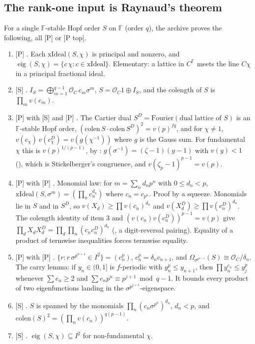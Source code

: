 \documentclass[11pt]{article}
\newcommand{\mP}{\textsf{[P]}}
\newcommand{\mPt}{\textsf{[P top]}}
\newcommand{\mS}{\textsf{[S]}}
\newcommand{\cO}{\mathcal O}
\newcommand{\Fq}{\mathbb F}
\theoremstyle{remark}
\begin{document}
\subsection{The rank-one input is Raynaud's theorem}\label{sec:raynaud}
For a single $\Fq$-stable Hopf order $S$ on $\Fq$ (order $q$), the archive proves the following, all \mP{} or \mPt.
\begin{enumerate}[nosep]
\item \mP{} . Each $\mathrm{xIdeal}(S,\chi)$ is principal and nonzero, and $\operatorname{eig}(S,\chi)=\{c\,\chi: c\in\mathrm{xIdeal}\}$. Elementary: a lattice in $C^{\Fq}$ meets the line $C\chi$ in a principal fractional ideal.
\item \mS{} . $I_S=\bigoplus_{m=1}^{q-1}\cO_C\,c_m\sigma^m$, $S=\cO_C1\oplus I_S$, and the colength of $S$ is $\prod_m v(c_m)$.
\item \mP{}  with \mS{}  and \mP{} . The Cartier dual $S^D=\mathrm{Fourier}(\text{dual lattice of }S)$ is an $\Fq$-stable Hopf order, $(\mathrm{colen}\,S\cdot\mathrm{colen}\,S^D)^2=v(p)^{fq}$, and for $\chi\ne1$, $v(c_\chi)\,v(c^D_\chi)=v(g(\chi^{-1}))$ where $g$ is the Gauss sum. For fundamental $\chi$ this is $v(p)^{1/(p-1)}$, by : $g(\sigma^{-1})=(\zeta-1)(y-1)$ with $v(y)<1$ (), which is Stickelberger's congruence, and $v(\zeta_p-1)^{p-1}=v(p)$.
\item \mP{}  with \mP{} . Monomial law: for $m=\sum_n d_np^n$ with $0\le d_n<p$, $\mathrm{xIdeal}(S,\sigma^m)=(\prod_nc_n^{d_n})$ where $c_n=c_{p^n}$. Proof by a squeeze. Monomials lie in $S$ and in $S^D$, so $v(X_d)\ge\prod v(c_n)^{d_n}$ and $v(X^D_d)\ge\prod v(c^D_n)^{d_n}$. The colength identity of item 3 and $(v(c_n)v(c_n^D))^{p-1}=v(p)$ give $\prod_d X_dX^D_d=\prod_d\prod_n(c_nc_n^D)^{d_n}$ (, a digit-reversal pairing). Equality of a product of termwise inequalities forces termwise equality.
\item \mP{}  with \mP{} . $\{r: r\,\sigma^{p^{n+1}}\in I^2\}=(c_n^p)$, $c_n^p=\delta_nc_{n+1}$, and $\Omega_{\sigma^{p^{n+1}}}(S)\cong\cO_C/\delta_n$. The carry lemma: if $y_n\in(0,1]$ is $f$-periodic with $y_n^p\le y_{n+1}$, then $\prod y_n^{e_n}\le y_j^p$ whenever $\sum e_n\ge2$ and $\sum e_np^n\equiv p^{j+1}\bmod q-1$. It bounds every product of two eigenfunctions landing in the $\sigma^{p^{j+1}}$-eigenspace.
\item \mS{} . $S$ is spanned by the monomials $\prod_n(c_n\sigma^{p^n})^{d_n}$, $d_n<p$, and $\mathrm{colen}(S)^2=(\prod_nv(c_n))^{q(p-1)}$.
\item \mS{} . $\operatorname{eig}(S,\chi)\subseteq I^2$ for non-fundamental $\chi$.
\end{enumerate}
\end{document}
